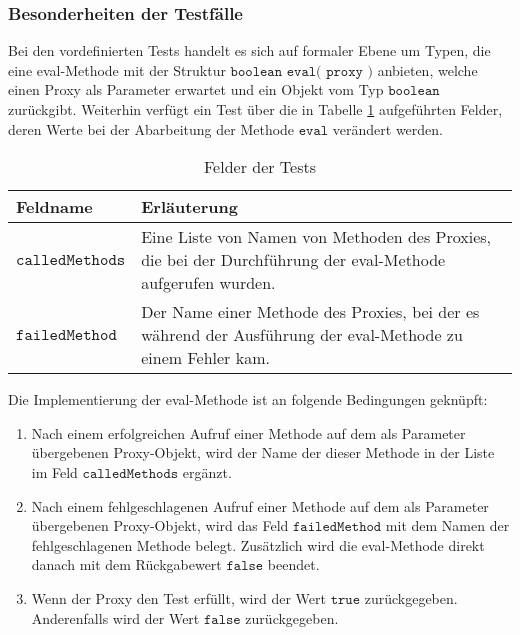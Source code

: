 \documentclass[a4paper,12pt]{article}
\begin{document}
\subsubsection{Besonderheiten der Testfälle}
Bei den vordefinierten Tests handelt es sich auf formaler Ebene um Typen, die eine eval-Methode mit der Struktur $\texttt{boolean eval( proxy )}$ anbieten, welche einen Proxy als Parameter erwartet und ein Objekt vom Typ $\texttt{boolean}$ zurückgibt. Weiterhin verfügt ein Test über die in Tabelle \ref{tab_testfelder}  aufgeführten Felder, deren Werte bei der Abarbeitung der Methode $\texttt{eval}$ verändert werden.
\begin{table}[H]
\centering
\begin{tabular}{|p{3cm}|p{10cm}|}
\hline
\hline
\textbf{Feldname} & \textbf{Erläuterung} \\
\hline
$\texttt{calledMethods}$
&
Eine Liste von Namen von Methoden des Proxies, die bei der Durchführung der eval-Methode aufgerufen wurden.
\\
\hline
$\texttt{failedMethod}$
&
Der Name einer Methode des Proxies, bei der es während der Ausführung der eval-Methode zu einem Fehler kam.
\\
\hline
\hline
\end{tabular}
\caption{Felder der Tests}
\label{tab_testfelder}
\end{table}
\noindent
Die Implementierung der eval-Methode ist an folgende Bedingungen geknüpft:
\begin{enumerate}
\item Nach einem erfolgreichen Aufruf einer Methode auf dem als Parameter übergebenen Proxy-Objekt, wird der Name der dieser Methode in der Liste im Feld $\texttt{calledMethods}$ ergänzt.
\item Nach einem fehlgeschlagenen Aufruf einer Methode auf dem als Parameter übergebenen Proxy-Objekt, wird das Feld $\texttt{failedMethod}$ mit dem Namen der fehlgeschlagenen Methode belegt. Zusätzlich wird die eval-Methode direkt danach mit dem Rückgabewert $\texttt{false}$ beendet.
\item Wenn der Proxy den Test erfüllt, wird der Wert $\texttt{true}$ zurückgegeben. Anderenfalls wird der Wert $\texttt{false}$ zurückgegeben.
\end{enumerate}
\end{document}

